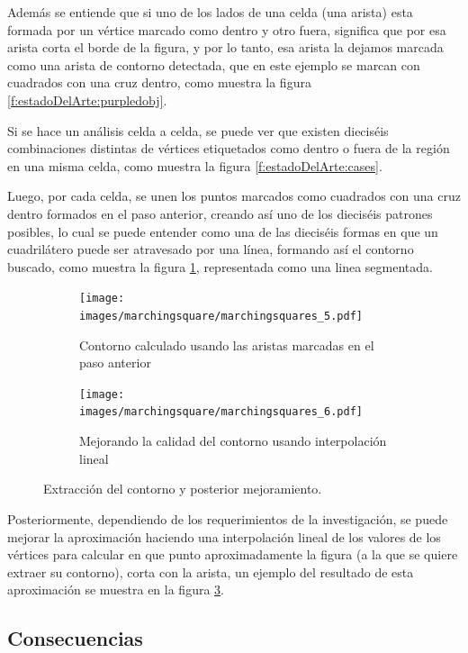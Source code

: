 Además se entiende que si uno de los lados de una celda (una arista) esta formada por un
vértice marcado como dentro y otro fuera, significa que por esa arista corta el borde de la figura,
y por lo tanto, esa arista la dejamos marcada como una arista de contorno detectada, que en este
ejemplo se marcan con cuadrados con una cruz dentro, como muestra la figura \ref{f:estadoDelArte:purpledobj}.

Si se hace un análisis celda a celda, se puede ver que existen dieciséis combinaciones distintas de
vértices etiquetados como dentro o fuera de la región en una misma celda, como muestra la figura
\ref{f:estadoDelArte:cases}.

Luego, por cada celda, se unen los puntos marcados como cuadrados con una cruz dentro formados en el paso anterior, creando así uno de los dieciséis patrones posibles, lo cual se puede entender como una de las dieciséis formas en que un cuadrilátero puede ser atravesado por una línea, formando así el contorno buscado, como muestra la figura \ref{f:estadoDelArte:connectedobj}, representada como una linea segmentada.

\begin{figure}[t]

	\begin{subfigure}[t]{0.46\textwidth}
	\centering
		\texttt{[image: images/marchingsquare/marchingsquares\_5.pdf]}
	\caption{Contorno calculado usando las aristas marcadas en el paso anterior}
	\label{f:estadoDelArte:connectedobj}
	\end{subfigure}
	\quad
	\begin{subfigure}[t]{0.46\textwidth}
	\centering
		\texttt{[image: images/marchingsquare/marchingsquares\_6.pdf]}
	\caption{Mejorando la calidad del contorno usando interpolación lineal}
	\label{f:estadoDelArte:2Dintersected}
	\end{subfigure}

	\caption{Extracción del contorno y posterior mejoramiento.}

\end{figure}

Posteriormente, dependiendo de los requerimientos de la investigación, se puede mejorar
la aproximación haciendo una interpolación lineal de los valores de los vértices para calcular en
que punto aproximadamente la figura (a la que se quiere extraer su contorno), corta con la arista,
un ejemplo del resultado de esta aproximación se muestra en la figura \ref{f:estadoDelArte:2Dintersected}.

\subsection{Consecuencias}
\label{subsec:marchingSquares:consecuencias}

